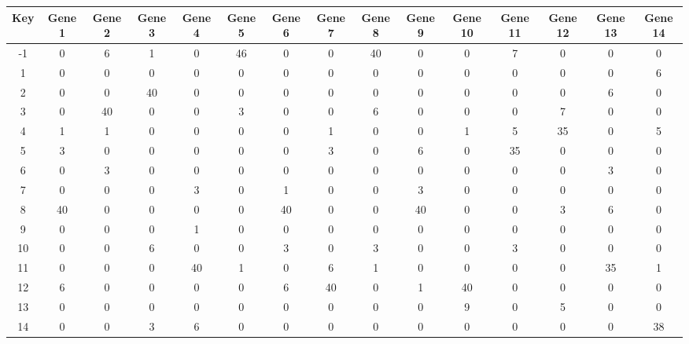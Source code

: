 \begin{tabular}{|c|c|c|c|c|c|c|c|c|c|c|c|c|c|c|}
\hline
Key & Gene 1 & Gene 2 & Gene 3 & Gene 4 & Gene 5 & Gene 6 & Gene 7 & Gene 8 & Gene 9 & Gene 10 & Gene 11 & Gene 12 & Gene 13 & Gene 14 \\
\hline
-1 & 0 & 6 & 1 & 0 & 46 & 0 & 0 & 40 & 0 & 0 & 7 & 0 & 0 & 0 \\
1 & 0 & 0 & 0 & 0 & 0 & 0 & 0 & 0 & 0 & 0 & 0 & 0 & 0 & 6 \\
2 & 0 & 0 & 40 & 0 & 0 & 0 & 0 & 0 & 0 & 0 & 0 & 0 & 6 & 0 \\
3 & 0 & 40 & 0 & 0 & 3 & 0 & 0 & 6 & 0 & 0 & 0 & 7 & 0 & 0 \\
4 & 1 & 1 & 0 & 0 & 0 & 0 & 1 & 0 & 0 & 1 & 5 & 35 & 0 & 5 \\
5 & 3 & 0 & 0 & 0 & 0 & 0 & 3 & 0 & 6 & 0 & 35 & 0 & 0 & 0 \\
6 & 0 & 3 & 0 & 0 & 0 & 0 & 0 & 0 & 0 & 0 & 0 & 0 & 3 & 0 \\
7 & 0 & 0 & 0 & 3 & 0 & 1 & 0 & 0 & 3 & 0 & 0 & 0 & 0 & 0 \\
8 & 40 & 0 & 0 & 0 & 0 & 40 & 0 & 0 & 40 & 0 & 0 & 3 & 6 & 0 \\
9 & 0 & 0 & 0 & 1 & 0 & 0 & 0 & 0 & 0 & 0 & 0 & 0 & 0 & 0 \\
10 & 0 & 0 & 6 & 0 & 0 & 3 & 0 & 3 & 0 & 0 & 3 & 0 & 0 & 0 \\
11 & 0 & 0 & 0 & 40 & 1 & 0 & 6 & 1 & 0 & 0 & 0 & 0 & 35 & 1 \\
12 & 6 & 0 & 0 & 0 & 0 & 6 & 40 & 0 & 1 & 40 & 0 & 0 & 0 & 0 \\
13 & 0 & 0 & 0 & 0 & 0 & 0 & 0 & 0 & 0 & 9 & 0 & 5 & 0 & 0 \\
14 & 0 & 0 & 3 & 6 & 0 & 0 & 0 & 0 & 0 & 0 & 0 & 0 & 0 & 38 \\
\hline
\end{tabular}
